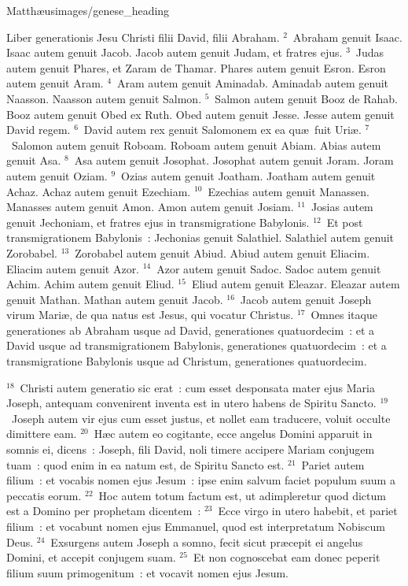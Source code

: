 {Matthæus}{images/genese_heading}


\lettrine[lines=10,image=true,loversize=0.05,lraise=-0.03]{L}{}iber generationis Jesu Christi filii David, filii Abraham.
${}^{2}$~Abraham genuit Isaac. Isaac autem genuit Jacob. Jacob autem genuit Judam, et fratres ejus.
${}^{3}$~Judas autem genuit Phares, et Zaram de Thamar. Phares autem genuit Esron. Esron autem genuit Aram.
${}^{4}$~Aram autem genuit Aminadab. Aminadab autem genuit Naasson. Naasson autem genuit Salmon.
${}^{5}$~Salmon autem genuit Booz de Rahab. Booz autem genuit Obed ex Ruth. Obed autem genuit Jesse. Jesse autem genuit David regem.
${}^{6}$~David autem rex genuit Salomonem ex ea qu\ae\ fuit Uri\ae .
${}^{7}$~Salomon autem genuit Roboam. Roboam autem genuit Abiam. Abias autem genuit Asa.
${}^{8}$~Asa autem genuit Josophat. Josophat autem genuit Joram. Joram autem genuit Oziam.
${}^{9}$~Ozias autem genuit Joatham. Joatham autem genuit Achaz. Achaz autem genuit Ezechiam.
${}^{10}$~Ezechias autem genuit Manassen. Manasses autem genuit Amon. Amon autem genuit Josiam.
${}^{11}$~Josias autem genuit Jechoniam, et fratres ejus in transmigratione Babylonis.
${}^{12}$~Et post transmigrationem Babylonis~: Jechonias genuit Salathiel. Salathiel autem genuit Zorobabel.
${}^{13}$~Zorobabel autem genuit Abiud. Abiud autem genuit Eliacim. Eliacim autem genuit Azor.
${}^{14}$~Azor autem genuit Sadoc. Sadoc autem genuit Achim. Achim autem genuit Eliud.
${}^{15}$~Eliud autem genuit Eleazar. Eleazar autem genuit Mathan. Mathan autem genuit Jacob.
${}^{16}$~Jacob autem genuit Joseph virum Mari\ae , de qua natus est Jesus, qui vocatur Christus.
${}^{17}$~Omnes itaque generationes ab Abraham usque ad David, generationes quatuordecim~: et a David usque ad transmigrationem Babylonis, generationes quatuordecim~: et a transmigratione Babylonis usque ad Christum, generationes quatuordecim.


${}^{18}$~Christi autem generatio sic erat~: cum esset desponsata mater ejus Maria Joseph, antequam convenirent inventa est in utero habens de Spiritu Sancto.
${}^{19}$~Joseph autem vir ejus cum esset justus, et nollet eam traducere, voluit occulte dimittere eam.
${}^{20}$~H\ae c autem eo cogitante, ecce angelus Domini apparuit in somnis ei, dicens~: Joseph, fili David, noli timere accipere Mariam conjugem tuam~: quod enim in ea natum est, de Spiritu Sancto est.
${}^{21}$~Pariet autem filium~: et vocabis nomen ejus Jesum~: ipse enim salvum faciet populum suum a peccatis eorum.
${}^{22}$~Hoc autem totum factum est, ut adimpleretur quod dictum est a Domino per prophetam dicentem~:
${}^{23}$~Ecce virgo in utero habebit, et pariet filium~: et vocabunt nomen ejus Emmanuel, quod est interpretatum Nobiscum Deus.
${}^{24}$~Exsurgens autem Joseph a somno, fecit sicut pr\ae cepit ei angelus Domini, et accepit conjugem suam.
${}^{25}$~Et non cognoscebat eam donec peperit filium suum primogenitum~: et vocavit nomen ejus Jesum.

